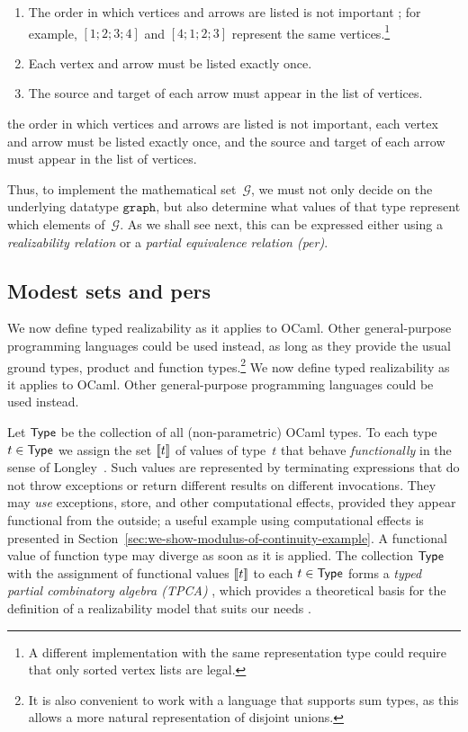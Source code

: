%
\iflong
\begin{enumerate}
\item The order in which vertices and arrows are listed is not
  important%
; for example, $[1;2;3;4]$ and $[4;1;2;3]$ represent the same vertices.\footnote{
  A different implementation with the same representation type could require
  that only sorted vertex lists are legal.}
\item Each vertex and arrow must be listed exactly once.
\item The source and target of each arrow must appear in the list of vertices.
\end{enumerate}
\else %
the order in which vertices and arrows are listed is not
important, each vertex and arrow must be listed exactly once, and
the source and target of each arrow must appear in the list of vertices.
\fi %

%
Thus, to implement the mathematical set~$\mathcal{G}$, we must not
only decide on the underlying datatype $\mathtt{graph}$, but also
determine what values of that type represent which elements
of~$\mathcal{G}$. As we shall see next, this can be expressed either
using a \emph{realizability relation} or a \emph{partial equivalence
  relation (per)}.


\subsection{Modest sets and pers}
\label{sec:modest-sets-pers}

\iflong
We now define typed realizability as it
applies to OCaml. Other general-purpose programming languages could be
used instead, as long as they provide the usual ground types, product
and function types.\footnote{It is also convenient to work with a
language that supports sum types, as this allows a more natural
representation of disjoint unions.}
\else
We now define typed realizability as it
applies to OCaml. Other general-purpose programming languages could be
used instead.
\fi %

Let $\mathsf{Type}$ be the collection of all (non-parametric) OCaml types. To
each type $t \in \mathsf{Type}$ we assign the set $[\![t]\!]$ of values of
type~$t$ that behave \emph{functionally} in the sense of
Longley~\cite{longley99when}. Such values are represented by
terminating expressions that do not throw exceptions or return
different results on different invocations. They may \emph{use}
exceptions, store, and other computational effects, provided they
appear functional from the outside; a useful example using
computational effects is presented in
Section~\ref{sec:we-show-modulus-of-continuity-example}. A functional
value of function type may diverge as soon as it is applied. The
collection $\mathsf{Type}$ with the assignment of functional values
$[\![t]\!]$ to each $t \in \mathsf{Type}$ forms a \emph{typed partial
  combinatory algebra (TPCA)}%
\iflong
, which provides a theoretical basis for
the definition of a realizability model that suits our needs
\fi %
.

